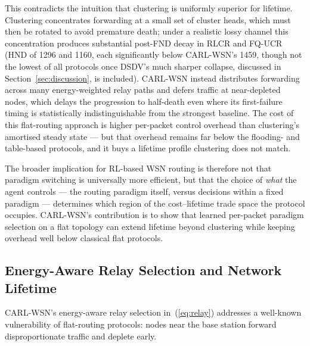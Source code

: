 \documentclass[12pt]{article}
\begin{document}
This contradicts the intuition that clustering is uniformly superior
for lifetime. Clustering concentrates forwarding at a small set of
cluster heads, which must then be rotated to avoid premature death;
under a realistic lossy channel this concentration produces
substantial post-FND decay in RLCR and FQ-UCR (HND of 1296 and
1160, each significantly below CARL-WSN's 1459, though not the
lowest of all protocols once DSDV's much sharper collapse, discussed
in Section~\ref{sec:discussion}, is included). CARL-WSN instead
distributes forwarding across many energy-weighted relay paths and
defers traffic at near-depleted nodes, which delays the progression
to half-death even where its first-failure timing is statistically
indistinguishable from the strongest baseline. The cost of this
flat-routing approach is higher per-packet control overhead than
clustering's amortised steady state --- but that overhead remains
far below the flooding- and table-based protocols, and it buys a
lifetime profile clustering does not match.

The broader implication for RL-based WSN routing is therefore not
that paradigm switching is universally more efficient, but that the
choice of \emph{what} the agent controls --- the routing paradigm
itself, versus decisions within a fixed paradigm --- determines which
region of the cost--lifetime trade space the protocol occupies.
CARL-WSN's contribution is to show that learned per-packet paradigm
selection on a flat topology can extend lifetime beyond clustering
while keeping overhead well below classical flat protocols.

\subsection{Energy-Aware Relay Selection and Network Lifetime}

CARL-WSN's energy-aware relay selection in~(\ref{eq:relay}) addresses
a well-known vulnerability of flat-routing protocols: nodes near the
base station forward disproportionate traffic and deplete early.
\end{document}
